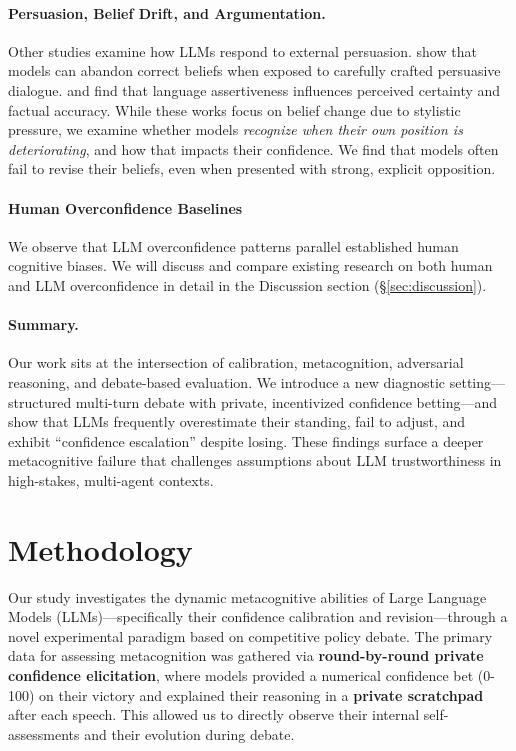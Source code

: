 \documentclass{article}
\begin{document}
\paragraph{Persuasion, Belief Drift, and Argumentation.}
Other studies examine how LLMs respond to external persuasion. \citet{xu2023earthflat} show that models can abandon correct beliefs when exposed to carefully crafted persuasive dialogue. \citet{zhou2023epistemic} and \citet{rivera2023assertive} find that language assertiveness influences perceived certainty and factual accuracy. While these works focus on belief change due to stylistic pressure, we examine whether models \textit{recognize when their own position is deteriorating}, and how that impacts their confidence. We find that models often fail to revise their beliefs, even when presented with strong, explicit opposition.

\paragraph{Human Overconfidence Baselines}
We observe that LLM overconfidence patterns parallel established human cognitive biases. We will discuss and compare existing research on both human and LLM overconfidence in detail in the Discussion section (\S\ref{sec:discussion}).

\paragraph{Summary.}
Our work sits at the intersection of calibration, metacognition, adversarial reasoning, and debate-based evaluation. We introduce a new diagnostic setting—structured multi-turn debate with private, incentivized confidence betting—and show that LLMs frequently overestimate their standing, fail to adjust, and exhibit ``confidence escalation'' despite losing. These findings surface a deeper metacognitive failure that challenges assumptions about LLM trustworthiness in high-stakes, multi-agent contexts.

\section{Methodology}
\label{sec:methodology}

Our study investigates the dynamic metacognitive abilities of Large Language Models (LLMs)—specifically their confidence calibration and revision—through a novel experimental paradigm based on competitive policy debate. The primary data for assessing metacognition was gathered via \textbf{round-by-round private confidence elicitation}, where models provided a numerical confidence bet (0-100) on their victory and explained their reasoning in a \textbf{private scratchpad} after each speech. This allowed us to directly observe their internal self-assessments and their evolution during debate.
\end{document}
